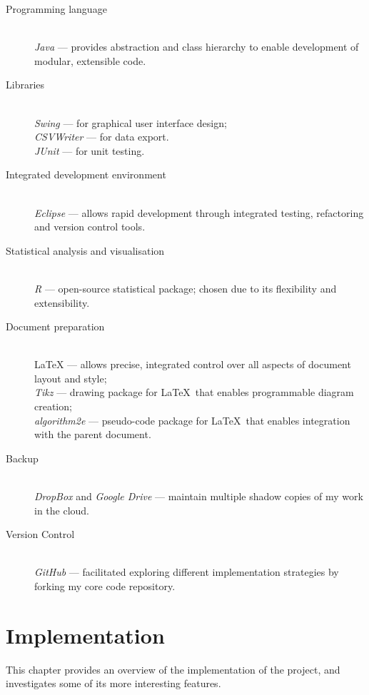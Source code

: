 \documentclass[12pt,notitlepage]{report}
\begin{document}
\begin{description}
  \item[Programming language] \hfill \\
  {\em Java} --- provides abstraction and class hierarchy to enable development of modular, extensible code.
  \item[Libraries] \hfill \\
  {\em Swing} --- for graphical user interface design;\\ 
  {\em CSVWriter} --- for data export.\\
  {\em JUnit} --- for unit testing.
  \item[Integrated development environment] \hfill \\
  {\em Eclipse} --- allows rapid development through integrated testing, refactoring and version control tools.
  \item[Statistical analysis and visualisation] \hfill \\
  {\em R} --- open-source statistical package; chosen due to its flexibility and extensibility.
  \item[Document preparation] \hfill \\
  {\LaTeX} --- allows precise, integrated control over all aspects of document layout and style;\\
  {\em Tikz} --- drawing package for \LaTeX\ that enables programmable diagram creation;\\
  {\em algorithm2e} --- pseudo-code package for \LaTeX\ that enables integration with the parent document.
  \item[Backup] \hfill \\
  {\em DropBox} and {\em Google Drive} --- maintain multiple shadow copies of my work in the cloud.
  \item[Version Control]\hfill \\
  {\em GitHub} --- facilitated exploring different implementation strategies by forking my core code repository.
  
\end{description}

\chapter{Implementation}

This chapter provides an overview of the implementation of the project, and investigates some of its more interesting features.\\
\end{document}
